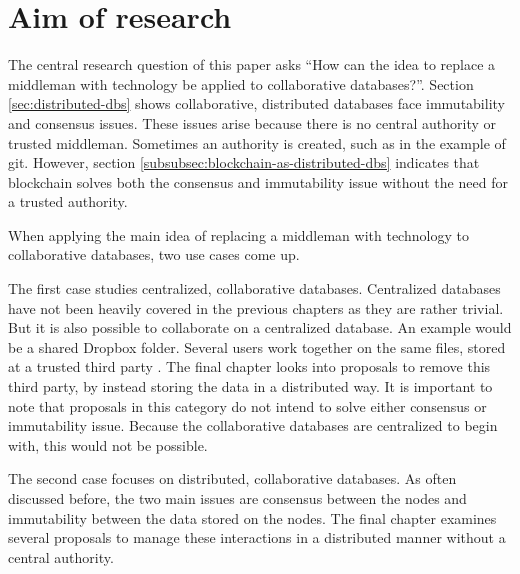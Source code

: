 \chapter{Aim of research}

\iffalse
- start with consensus and consistency in col. distr. dbs => because no central authority
- pivot into main idea: have technology replace an indispensable middleman. As discussed in \ref{subsec:examples-distributed-dbs}, blockchains solve both issues very well. 
- to apply the main idea to collaborative databases: two approaches. First a centralized collaborative database can be stored without a middleman. Second, the interaction between a nodes of a distributed collaborative database can be managed without a middleman
- For the first approach, the final chapter looks into proposals to store data in a distributed manner. Every proposal is examined on advantages, disadvantages, viability and current implementations.
- Concerning the second approach, the last chapter focuses on proposals to manage the interaction 
\fi

The central research question of this paper asks ``How can the idea to replace a middleman with technology be applied to collaborative databases?''. Section \ref{sec:distributed-dbs} shows collaborative, distributed databases face immutability and consensus issues. These issues arise because there is no central authority or trusted middleman. Sometimes an authority is created, such as in the example of git. However, section \ref{subsubsec:blockchain-as-distributed-dbs} indicates that blockchain solves both the consensus and immutability issue without the need for a trusted authority.

When applying the main idea of replacing a middleman with technology to collaborative databases, two use cases come up.

The first case studies centralized, collaborative databases. Centralized databases have not been heavily covered in the previous chapters as they are rather trivial. But it is also possible to collaborate on a centralized database. An example would be a shared Dropbox folder. Several users work together on the same files, stored at a trusted third party \cite{dropbox-sharing}. The final chapter looks into proposals to remove this third party, by instead storing the data in a distributed way. It is important to note that proposals in this category do not intend to solve either consensus or immutability issue. Because the collaborative databases are centralized to begin with, this would not be possible.

The second case focuses on distributed, collaborative databases. As often discussed before, the two main issues are consensus between the nodes and immutability between the data stored on the nodes. The final chapter examines several proposals to manage these interactions in a distributed manner without a central authority.


